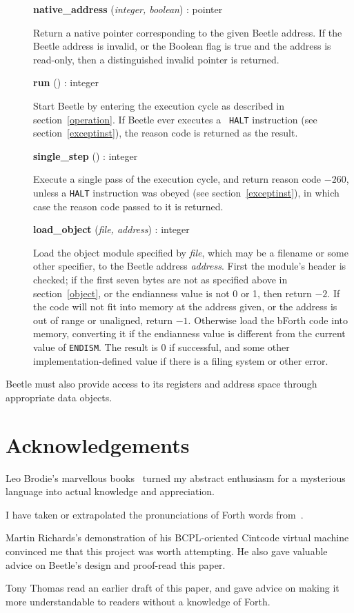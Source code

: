 \documentclass{article}
\newlength{\itemwidth}\itemwidth=\textwidth \advance\itemwidth by -0.1in
\newlength{\pronunc}\pronunc=1.7in
\newlength{\innerwidth}\innerwidth=\itemwidth \advance\innerwidth by -0.5in
\newcommand{\iface}[4]{\item[]\parbox{\itemwidth}{{\bf #1} ({\it #2}\/) :
#3\\[0.5ex]\hspace*{0.4in}\parbox{\innerwidth}{#4}}}
\begin{document}
\begin{description}
\iface{native\_address}{integer, boolean}{pointer}{Return a native pointer corresponding
    to the given Beetle address. If the Beetle address is invalid, or the Boolean flag is true and the address is read-only, then a distinguished invalid pointer is returned.}
\iface{run}{}{integer}{Start Beetle by entering the execution cycle as
    described in section~\ref{operation}. If Beetle ever executes a {\tt
    HALT} instruction (see section~\ref{exceptinst}), the reason code is
    returned as the result.}
\iface{single\_step}{}{integer}{Execute a single pass of the execution
    cycle, and return reason code $-260$, unless a {\tt HALT} instruction was
    obeyed (see section~\ref{exceptinst}), in which case the reason code
    passed to it is returned.}
\iface{load\_object}{file, address}{integer}{Load the object module
    specified by \textit{file}, which may be a filename or some other
    specifier, to the Beetle address \textit{address}. First the module's
    header is checked; if the first seven bytes are not as specified above
    in section~\ref{object}, or the endianness value is not 0 or 1, then
    return $-2$. If the code will not fit into memory at the address given, or
    the address is out of range or unaligned, return $-1$. Otherwise load the bForth code into
    memory, converting it if the endianness value is different from the current
    value of {\tt ENDISM}. The result is 0 if successful, and some other
    implementation-defined value if there is a filing system or other error.}
\end{description}

Beetle must also provide access to its registers and address space through
appropriate data objects.


\section*{Acknowledgements}

Leo Brodie's marvellous books~\cite{starting4th,thinking4th} turned my abstract
enthusiasm for a mysterious language into actual knowledge and appreciation.

I have taken or extrapolated the pronunciations of Forth words from~\cite{ANSIforth}.

Martin Richards's demonstration of his BCPL-oriented Cintcode virtual machine
convinced me that this project was worth attempting. He also gave valuable
advice on Beetle's design and proof-read this paper.

Tony Thomas read an earlier draft of this paper, and gave advice on making it
more understandable to readers without a knowledge of Forth.




\end{document}
